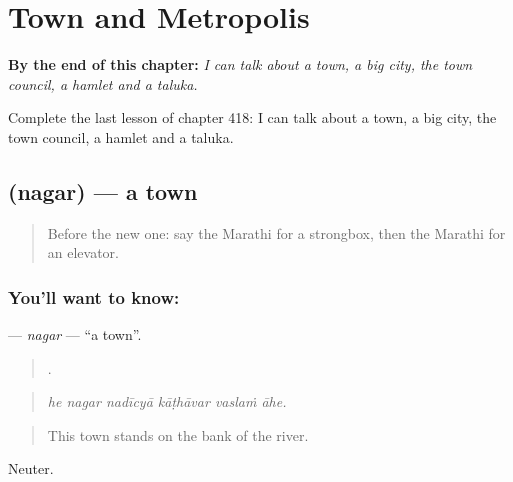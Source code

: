
\chapter{Town and Metropolis}
\label{ch:mr-town-and-metropolis}

\begin{chapteropening}
\textbf{By the end of this chapter:} \emph{I can talk about a town, a big city, the town council, a hamlet and a taluka.}

Complete the last lesson of chapter 418: I can talk about a town, a big city, the town council, a hamlet and a taluka.
\end{chapteropening}

\section[\texorpdfstring{\mr{नगर} (nagar)}{नगर (nagar)}]{ (nagar) — a town}

\label{lesson:MR-C418-nagar}



\begin{quote}
Before the new one: say the Marathi for a strongbox, then the Marathi for an elevator.
\end{quote}

\subsection*{You'll want to know: }
\textbf{} — \emph{nagar} — \textquotedblleft{}a town\textquotedblright{}.

\begin{quote}
     .
\end{quote}

\begin{quote}
\emph{he nagar nadīcyā kāṭhāvar vaslaṁ āhe.}
\end{quote}

\begin{quote}
This town stands on the bank of the river.
\end{quote}

Neuter.

